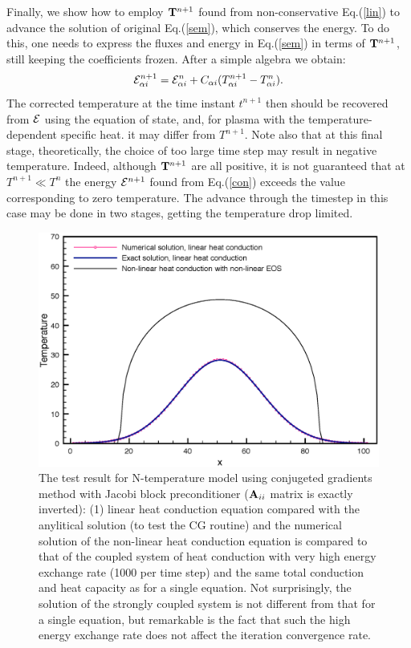 Finally, we show how to employ ${\bf T}^{n+1}$ found from non-conservative Eq.(\ref{lin}) to advance the solution of original 
Eq.(\ref{sem}), which conserves the energy. To do this, one needs to express the fluxes and energy in Eq.(\ref{sem}) in terms of
${\bf T}^{n+1}$, still keeping the coefficients frozen. After a simple algebra we obtain:
\begin{equation}\label{con}
{\cal E}_{\alpha i}^{n+1} = {\cal E}_{\alpha i}^{n}+C_{\alpha i}(T^{n+1}_{\alpha i}-T^n_{\alpha i}).
\end{equation} 
The corrected temperature at the time instant $t^{n+1}$ then should be recovered from ${\cal E}$ using the equation of state, and,
for plasma with the temperature-dependent specific heat. it may differ from $T^{n+1}$.  
Note also that at this final stage, theoretically, the choice of too large time step may result in negative temperature. Indeed, although ${\bf T}^{n+1}$ 
are all positive, it is not guaranteed that at $T^{n+1}\ll T^{n}$ the energy ${\cal E}^{n+1}$ found from Eq.(\ref{con}) exceeds the value corresponding to
zero temperature. The advance through the timestep in this case may be done in two stages, getting the temperature drop limited.
\begin{figure}
\includegraphics[scale=0.50]{Fig1.eps}
\caption{The test result for N-temperature model using conjugeted gradients method with Jacobi block preconditioner (${\bf A}_{ii}$ matrix is 
exactly inverted): (1) linear heat conduction equation compared with the anylitical solution  (to test the CG routine) and the numerical solution 
of the non-linear heat conduction equation is compared to that of the coupled system of heat conduction with very high energy exchange rate 
(1000 per time step) and the same total conduction and heat capacity as for a single equation. Not surprisingly, the solution of the strongly coupled 
system is not different from that for a single equation, but remarkable is the fact that such the high energy exchange rate does not affect
the iteration convergence rate.
}
\label{fig_1}
\end{figure}  
